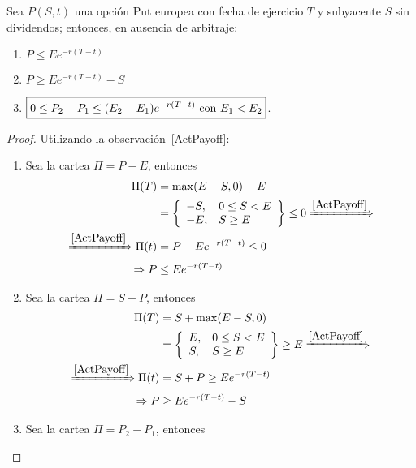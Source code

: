 \begin{proposition}
    Sea $P(S,t)$ una opción Put europea con fecha de ejercicio $T$ y subyacente $S$ sin dividendos; entonces, en ausencia de arbitraje:
    \begin{enumerate}
        \item $\boxed{P \leq Ee^{-r(T-t)}}$
        \item $\boxed{P \geq Ee^{-r(T-t)} - S}$
        \item $\boxed{0 \leq P_2 - P_1 \leq (E_2-E_1)e^{-r(T-t)}$ con $E_1<E_2}$.
    \end{enumerate}
\end{proposition}
\begin{proof}
    Utilizando la observación~\ref{ActPayoff}:
    \begin{enumerate}
        \item Sea la cartea $\Pi = P - E$, entonces
        \begin{align*}
            \Pi(T) &= \max(E - S,0) - E \\
            &= \left\{
            \begin{array}{ll}
              -S,       & 0 \leq S < E \\
              -E,        & S \geq E
            \end{array}
            \right\} \leq 0 \xRightarrow{\ref{ActPayoff}}\\
            \xRightarrow{\ref{ActPayoff}} \Pi(t) &= P - Ee^{-r(T-t)} \leq 0 \\
            \Rightarrow P &\leq  Ee^{-r(T-t)}
        \end{align*}
        \item Sea la cartea $\Pi = S + P$, entonces
        \begin{align*}
            \Pi(T) &= S +\max(E - S,0) \\
            &= \left\{
            \begin{array}{ll}
              E,       & 0 \leq S < E \\
              S,        & S \geq E
            \end{array}
            \right\} \geq E \xRightarrow{\ref{ActPayoff}}\\
            \xRightarrow{\ref{ActPayoff}} \Pi(t) &= S + P \geq Ee^{-r(T-t)} \\
            \Rightarrow P &\geq  Ee^{-r(T-t)} - S
        \end{align*}
        \item Sea la cartea $\Pi = P_2 - P_1$, entonces

\end{enumerate}
\end{proof}
